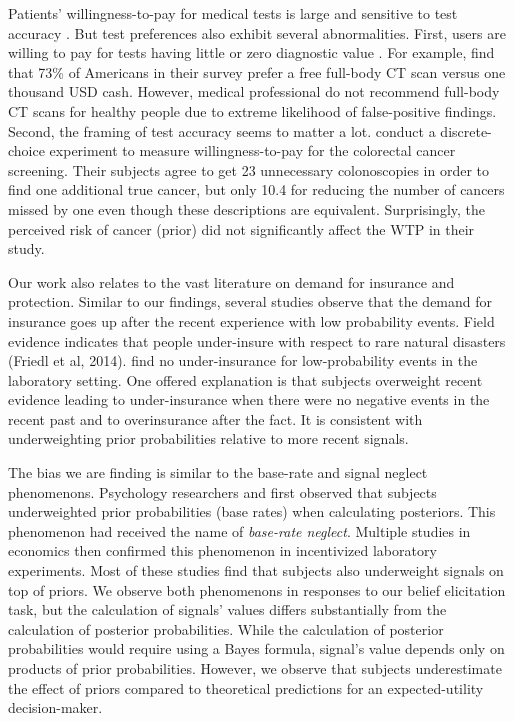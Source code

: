 \documentclass[12pt,a4paper]{article}
\begin{document}
Patients' willingness-to-pay for medical tests is large and sensitive to test accuracy \citep{liang_acceptability_2003, howard_does_2009, neumann_willingness--pay_2012}. But test preferences also exhibit several abnormalities. First, users are willing to pay for tests having little or zero diagnostic value \citep{schwartz_enthusiasm_2004, neumann_willingness--pay_2012}. For example, \citet{schwartz_enthusiasm_2004} find that 73\% of Americans in their survey prefer a free full-body CT scan versus one thousand USD cash. However, medical professional do not recommend full-body CT scans for healthy people due to extreme likelihood of false-positive findings. Second, the framing of test accuracy seems to matter a lot. \citet{howard_does_2009} conduct a discrete-choice experiment to measure willingness-to-pay for the colorectal cancer screening. Their subjects agree to get 23 unnecessary colonoscopies in order to find one additional true cancer, but only 10.4 for reducing the number of cancers missed by one even though these descriptions are equivalent. Surprisingly, the perceived risk of cancer (prior) did not significantly affect the WTP in their study.

Our work also relates to the vast literature on demand for insurance and protection. Similar to our findings, several studies observe that the demand for insurance goes up after the recent experience with low probability events. Field evidence indicates that people under-insure with respect to rare natural disasters (Friedl et al, 2014). \citet{laury_insurance_2009} find no under-insurance for low-probability events in the laboratory setting. One offered explanation \citep{volkman-wise_representativeness_2015} is that subjects overweight recent evidence leading to under-insurance when there were no negative events in the recent past and to overinsurance after the fact. It is consistent with underweighting prior probabilities relative to more recent signals. 

The bias we are finding is similar to the base-rate and signal neglect phenomenons. Psychology researchers \citet{hammerton_case_1973} and \citet{kahneman_psychology_1973} first observed that subjects underweighted prior probabilities (base rates) when calculating posteriors. This phenomenon had received the name of \textit{base-rate neglect}. Multiple studies in economics then confirmed \citep*{grether_testing_1992, holt_update_2009} this phenomenon in incentivized laboratory experiments. Most of these studies find that subjects also underweight signals on top of priors.  We observe both phenomenons in responses to our belief elicitation task, but the calculation of signals' values differs substantially from the calculation of posterior probabilities. While the calculation of posterior probabilities would require using a Bayes formula, signal's value depends only on products of prior probabilities. However, we observe that subjects underestimate the effect of priors compared to theoretical predictions for an expected-utility decision-maker.
\end{document}
